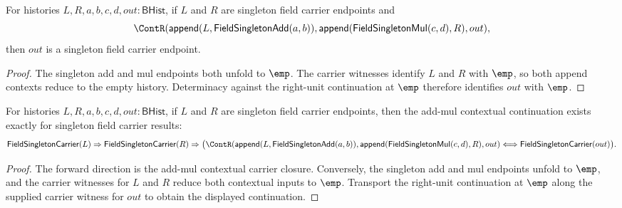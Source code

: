 \begin{theorem}
\label{thm:field-singleton-add-mul-context-continuation-result-carrier}
For histories $L,R,a,b,c,d,out:\mathsf{BHist}$, if $L$ and $R$ are singleton
field carrier endpoints and
$$
\ContR(\mathsf{append}(L,\mathsf{FieldSingletonAdd}(a,b)),
  \mathsf{append}(\mathsf{FieldSingletonMul}(c,d),R),out),
$$
then $out$ is a singleton field carrier endpoint.
\end{theorem}
\begin{proof}
The singleton add and mul endpoints both unfold to $\emp$. The carrier
witnesses identify $L$ and $R$ with $\emp$, so both append contexts reduce to
the empty history. Determinacy against the right-unit continuation at $\emp$
therefore identifies $out$ with $\emp$.
\end{proof}

\begin{theorem}
\label{thm:field-singleton-addmul-context-continuation-result-iff}
For histories $L,R,a,b,c,d,out:\mathsf{BHist}$, if $L$ and $R$ are singleton
field carrier endpoints, then the add-mul contextual continuation exists
exactly for singleton field carrier results:
$$
\mathsf{FieldSingletonCarrier}(L)\Rightarrow
\mathsf{FieldSingletonCarrier}(R)\Rightarrow
\bigl(
\ContR(\mathsf{append}(L,\mathsf{FieldSingletonAdd}(a,b)),
  \mathsf{append}(\mathsf{FieldSingletonMul}(c,d),R),out)
\Longleftrightarrow
\mathsf{FieldSingletonCarrier}(out)
\bigr).
$$
\end{theorem}
\begin{proof}
The forward direction is the add-mul contextual carrier closure. Conversely,
the singleton add and mul endpoints unfold to $\emp$, and the carrier
witnesses for $L$ and $R$ reduce both contextual inputs to $\emp$. Transport
the right-unit continuation at $\emp$ along the supplied carrier witness for
$out$ to obtain the displayed continuation.
\end{proof}


